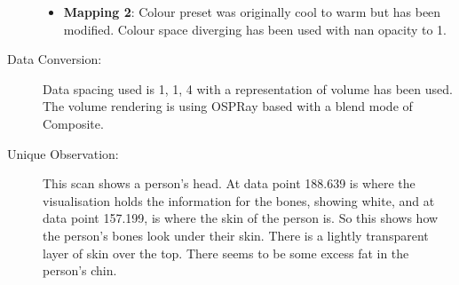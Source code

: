 \begin{description}
	\begin{itemize}
		\tightlist
		\item
		\textbf{Mapping 2}:
		\hfill \break
			Colour preset was originally cool to warm but has been modified. Colour space diverging has been used with nan opacity to 1. 
	\end{itemize}
	
	\item[Data Conversion:] 
	\hfill \break
		Data spacing used is 1, 1, 4 with a representation of volume has been used. The volume rendering is using OSPRay based with a blend mode of Composite.
	
	\item[Unique Observation:]
	\hfill \break
		This scan shows a person's head. At data point 188.639 is where the visualisation holds the information for the bones, showing white, and at data point 157.199, is where the skin of the person is. So this shows how the person's bones look under their skin. There is a lightly transparent layer of skin over the top. There seems to be some excess fat in the person's chin.
	
\end{description}
